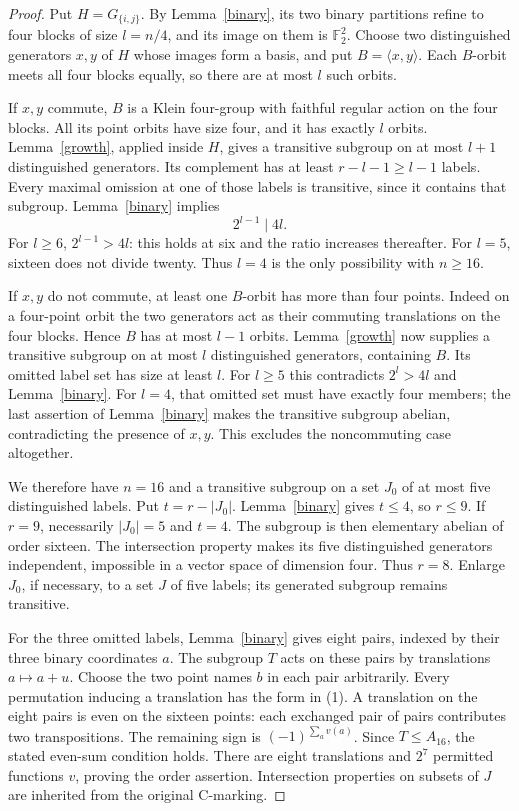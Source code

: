 \documentclass[11pt,a4paper]{article}
\newcommand{\gen}[1]{\langle #1\rangle}
\begin{document}
\begin{proof}
Put $H=G_{\{i,j\}}$. By Lemma~\ref{binary}, its two binary
partitions refine to four blocks of size $l=n/4$, and its image
on them is $\mathbb F_2^2$. Choose two distinguished generators
$x,y$ of $H$ whose images form a basis, and put $B=\gen{x,y}$.
Each $B$-orbit meets all four blocks equally, so there are at
most $l$ such orbits.

If $x,y$ commute, $B$ is a Klein four-group with faithful regular
action on the four blocks. All its point orbits have size four,
and it has exactly $l$ orbits. Lemma~\ref{growth}, applied inside
$H$, gives a transitive subgroup on at most $l+1$ distinguished
generators. Its complement has at least $r-l-1\ge l-1$ labels.
Every maximal omission at one of those labels is transitive,
since it contains that subgroup. Lemma~\ref{binary} implies
\[
                          2^{l-1}\mid 4l.               \tag{2}
\]
For $l\ge6$, $2^{l-1}>4l$: this holds at six and the ratio
increases thereafter. For $l=5$, sixteen does not divide twenty.
Thus $l=4$ is the only possibility with $n\ge16$.

If $x,y$ do not commute, at least one $B$-orbit has more than
four points. Indeed on a four-point orbit the two generators
act as their commuting translations on the four blocks. Hence
$B$ has at most $l-1$ orbits. Lemma~\ref{growth} now supplies
a transitive subgroup on at most $l$ distinguished generators,
containing $B$. Its omitted label set has size at least $l$.
For $l\ge5$ this contradicts $2^l>4l$ and Lemma~\ref{binary}.
For $l=4$, that omitted set must have exactly four members;
the last assertion of Lemma~\ref{binary} makes the transitive
subgroup abelian, contradicting the presence of $x,y$.
This excludes the noncommuting case altogether.

We therefore have $n=16$ and a transitive subgroup on a set
$J_0$ of at most five distinguished labels. Put $t=r-|J_0|$.
Lemma~\ref{binary} gives $t\le4$, so $r\le9$. If $r=9$,
necessarily $|J_0|=5$ and $t=4$. The subgroup is then
elementary abelian of order sixteen. The intersection property
makes its five distinguished generators independent, impossible
in a vector space of dimension four. Thus $r=8$.
Enlarge $J_0$, if necessary, to a set $J$ of five labels;
its generated subgroup remains transitive.

For the three omitted labels, Lemma~\ref{binary} gives eight
pairs, indexed by their three binary coordinates $a$. The
subgroup $T$ acts on these pairs by translations $a\mapsto a+u$.
Choose the two point names $b$ in each pair arbitrarily. Every
permutation inducing a translation has the form in (1).
A translation on the eight pairs is even on the sixteen points:
each exchanged pair of pairs contributes two transpositions.
The remaining sign is $(-1)^{\sum_a v(a)}$. Since $T\le A_{16}$,
the stated even-sum condition holds. There are eight translations
and $2^7$ permitted functions $v$, proving the order assertion.
Intersection properties on subsets of $J$ are inherited from
the original C-marking.
\end{proof}
\end{document}
